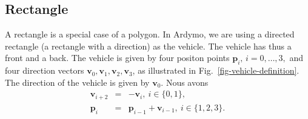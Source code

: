 \documentclass[11pt]{article}
\newcommand{\pb}{\mathbf{p}}
\newcommand{\vb}{\mathbf{v}}
\newcommand{\figref}[1]{Fig.~\eqref{#1}}
\begin{document}
\subsection{Rectangle}
\label{sec-rectangle}
A rectangle is a special case of a polygon. In Ardymo, we are using a directed
rectangle (a rectangle with a direction) as the vehicle. The vehicle has thus a
front and a back. The vehicle is given by four positon points
$\pb_i,\,i=0,\ldots,3,$ and four
direction vectors $\vb_0, \vb_1, \vb_2, \vb_3$, as illustrated in 
\figref{fig-vehicle-definition}. The direction of the vehicle is given by 
$\vb_0$.  Nous avons
\begin{eqnarray}
    \vb_{i+2} &=& -\vb_{i},\: i\in\{0,1\},\label{eq-v-v-rectangle} \\
    \pb_{i} &=& \pb_{i-1} + \vb_{i-1},\:i\in\{1,2,3\}.
\end{eqnarray}
\end{document}
